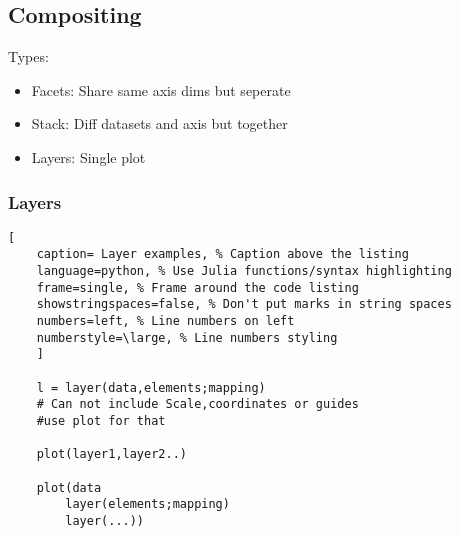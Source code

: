 \documentclass[11pt]{scrartcl} %
\begin{document}
\subsection{Compositing}

Types:
\begin{itemize}
	\item Facets: Share same axis dims but seperate
	\item Stack: Diff datasets and axis but together
	\item Layers: Single plot
\end{itemize}

\subsubsection{Layers}

\begin{lstlisting}[
	caption= Layer examples, % Caption above the listing
	language=python, % Use Julia functions/syntax highlighting
	frame=single, % Frame around the code listing
	showstringspaces=false, % Don't put marks in string spaces
	numbers=left, % Line numbers on left
	numberstyle=\large, % Line numbers styling
	]

	l = layer(data,elements;mapping) 
	# Can not include Scale,coordinates or guides
	#use plot for that

	plot(layer1,layer2..)

	plot(data
		layer(elements;mapping)
		layer(...))

\end{lstlisting}




\end{document}
